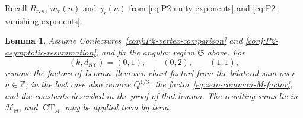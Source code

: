 \documentclass{amsart}
\newtheorem{lemma}{Lemma}
\theoremstyle{definition}
\numberwithin{equation}{section}
\newcommand{\Z}{\mathbb Z}
\begin{document}
Recall \(R_{r,n}\), \(m_r(n)\) and \(\gamma_r(n)\) from \eqref{eq:P2-unity-exponents} and \eqref{eq:P2-vanishing-exponents}.

\begin{lemma}
\label{lem:bilateral-u-zero-limit}
Assume Conjectures~\ref{conj:P2-vertex-comparison} and \ref{conj:P2-asymptotic-resummation}, and fix the angular region \(\mathfrak S\) above.  For
\[
 (k,d_{\mathrm{NY}})=(0,1),\qquad (0,2),\qquad (1,1),
\]
remove the factors of Lemma~\ref{lem:two-chart-factor} from the bilateral sum over \(n\in\Z\); in the last case also remove \(Q^{1/3}\), the factor \eqref{eq:zero-common-M-factor}, and the constants described in the proof of that lemma.  The resulting sums lie in \(\mathscr H_{\mathfrak S}\), and \(\operatorname{CT}_A\) may be applied term by term.
\end{lemma}
\end{document}
